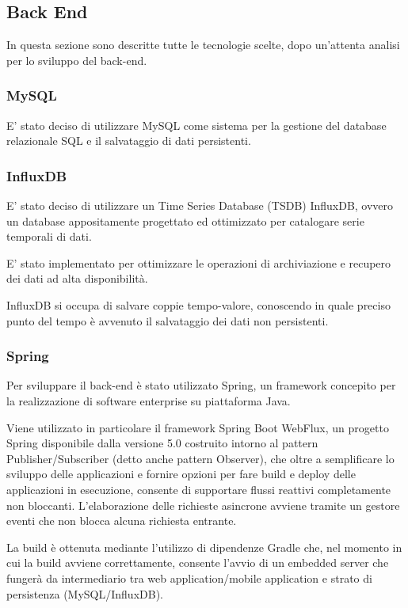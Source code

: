 \documentclass[../manuale-sviluppatore.tex]{subfiles}
\begin{document}
\subsection{Back End}%
\label{sub:back_end}
In questa sezione sono descritte tutte le tecnologie scelte, dopo un'attenta analisi per lo sviluppo del back-end.


\subsubsection{MySQL}%
\label{sub:mysql}
E' stato deciso di utilizzare MySQL come sistema per la gestione del database relazionale SQL e il salvataggio di dati persistenti.

\subsubsection{InfluxDB}%
\label{sub:influxdb}
E' stato deciso di utilizzare un Time Series Database (TSDB) InfluxDB, ovvero un database appositamente progettato ed ottimizzato per catalogare serie temporali di dati.

E' stato implementato per ottimizzare le operazioni di archiviazione e recupero dei dati ad alta disponibilità.

InfluxDB si occupa di salvare coppie tempo-valore, conoscendo in quale preciso punto del tempo è avvenuto il salvataggio dei dati non persistenti.

\subsubsection{Spring}%
\label{sub:spring}
Per sviluppare il back-end è stato utilizzato Spring, un framework concepito per la realizzazione di software enterprise su piattaforma Java.

Viene utilizzato in particolare il framework Spring Boot WebFlux, un progetto Spring disponibile dalla versione 5.0 costruito intorno al pattern Publisher/Subscriber (detto anche pattern Observer), che oltre a semplificare lo sviluppo delle applicazioni e fornire opzioni per fare build e deploy delle applicazioni in esecuzione, consente di supportare flussi reattivi completamente non bloccanti. L'elaborazione delle richieste asincrone avviene tramite un gestore eventi che non blocca alcuna richiesta entrante. 

La build è ottenuta mediante l'utilizzo di dipendenze Gradle che, nel momento in cui la build avviene correttamente, consente l'avvio di un embedded server che fungerà da intermediario tra web application/mobile application e strato di persistenza (MySQL/InfluxDB).
\end{document}
